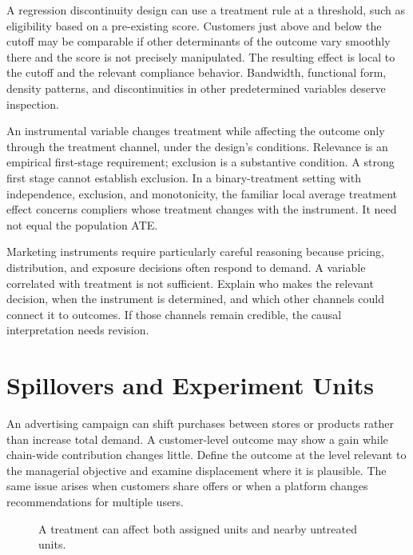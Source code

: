 \noindent A regression discontinuity design can use a treatment rule at a
threshold, such as eligibility based on a pre-existing score. Customers
just above and below the cutoff may be comparable if other determinants
of the outcome vary smoothly there and the score is not precisely
manipulated. The resulting effect is local to the cutoff and the
relevant compliance behavior. Bandwidth, functional form, density
patterns, and discontinuities in other predetermined variables deserve
inspection.

An instrumental variable changes treatment while affecting the outcome
only through the treatment channel, under the design's conditions.
Relevance is an empirical first-stage requirement; exclusion is a
substantive condition. A strong first stage cannot establish exclusion.
In a binary-treatment setting with independence, exclusion, and
monotonicity, the familiar local average treatment effect concerns
compliers whose treatment changes with the instrument. It need not equal
the population ATE.

Marketing instruments require particularly careful reasoning because
pricing, distribution, and exposure decisions often respond to demand. A
variable correlated with treatment is not sufficient. Explain who makes
the relevant decision, when the instrument is determined, and which
other channels could connect it to outcomes. If those channels remain
credible, the causal interpretation needs revision.

\hypertarget{M06-spillovers-and-experiment-units}{%
\section{Spillovers and Experiment
Units}\label{M06-spillovers-and-experiment-units}}

\noindent An advertising campaign can shift purchases between stores or products
rather than increase total demand. A customer-level outcome may show a
gain while chain-wide contribution changes little. Define the outcome at
the level relevant to the managerial objective and examine displacement
where it is plausible. The same issue arises when customers share offers
or when a platform changes recommendations for multiple users.

\begin{figure}[htbp]
\centering

\caption{A treatment can affect both assigned units and nearby untreated units.}\label{fig:M06_spillovers}
\end{figure}

